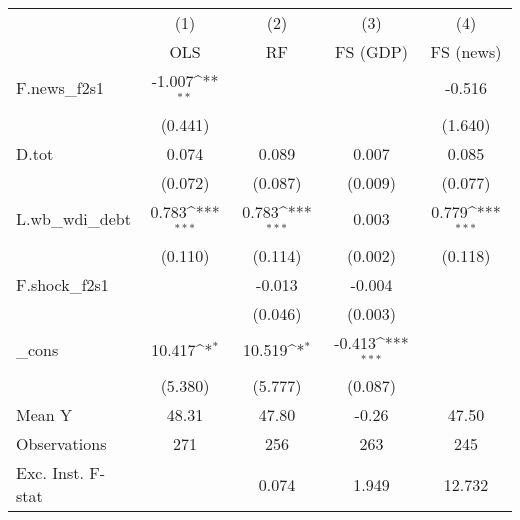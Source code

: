 {
\def\sym#1{\ifmmode^{#1}\else\(^{#1}\)\fi}
\begin{tabular}{l*{4}{c}}
\toprule
            &\multicolumn{1}{c}{(1)}&\multicolumn{1}{c}{(2)}&\multicolumn{1}{c}{(3)}&\multicolumn{1}{c}{(4)}\\
            &\multicolumn{1}{c}{OLS}&\multicolumn{1}{c}{RF}&\multicolumn{1}{c}{FS (GDP)}&\multicolumn{1}{c}{FS (news)}\\
\midrule
F.news\_f2s1 &      -1.007\sym{**} &                     &                     &      -0.516         \\
            &     (0.441)         &                     &                     &     (1.640)         \\
\addlinespace
D.tot       &       0.074         &       0.089         &       0.007         &       0.085         \\
            &     (0.072)         &     (0.087)         &     (0.009)         &     (0.077)         \\
\addlinespace
L.wb\_wdi\_debt&       0.783\sym{***}&       0.783\sym{***}&       0.003         &       0.779\sym{***}\\
            &     (0.110)         &     (0.114)         &     (0.002)         &     (0.118)         \\
\addlinespace
F.shock\_f2s1&                     &      -0.013         &      -0.004         &                     \\
            &                     &     (0.046)         &     (0.003)         &                     \\
\addlinespace
\_cons      &      10.417\sym{*}  &      10.519\sym{*}  &      -0.413\sym{***}&                     \\
            &     (5.380)         &     (5.777)         &     (0.087)         &                     \\
\midrule
Mean Y      &       48.31         &       47.80         &       -0.26         &       47.50         \\
Observations&         271         &         256         &         263         &         245         \\
Exc. Inst. F-stat&                     &       0.074         &       1.949         &      12.732         \\
\bottomrule
\end{tabular}
}

